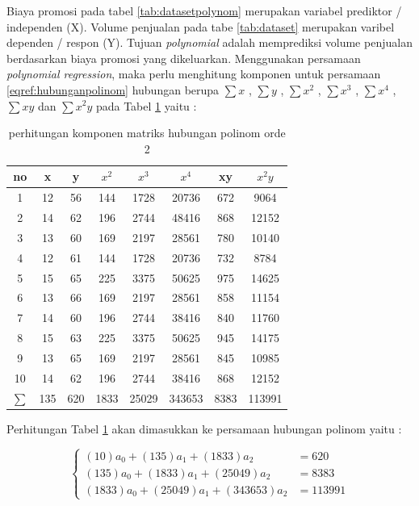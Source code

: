 \documentclass[a4paper,twoside]{article}
\begin{document}
\begin{enumerate}
Biaya promosi pada tabel \ref{tab:datasetpolynom} merupakan variabel prediktor / independen (X). Volume penjualan pada tabe \ref{tab:dataset} merupakan varibel dependen / respon (Y). Tujuan \textit{polynomial} adalah memprediksi volume penjualan berdasarkan biaya promosi yang dikeluarkan. Menggunakan persamaan \textit{polynomial regression}, maka perlu menghitung komponen untuk persamaan \eqref{eqref:hubunganpolinom} hubungan berupa $\sum x$ , $\sum y$ , $\sum x^2$ , $\sum x^3$ , $\sum x^4$ , $\sum xy$ dan $\sum x^2 y$ pada Tabel \ref{tab:tabelhubunganpolinomcontoh}  yaitu :  

\begin{table}[ht]
\centering 
\begin{tabular}{|c|c|c|c|c|c|c|c|}
\hline 
no & x & y & $x^2$ & $x^3$ & $x^4$ & xy & $x^2 y$ \\ 
\hline 
1 & 12 & 56 & 144 & 1728 & 20736 & 672 & 9064 \\ 
\hline 
2 & 14 & 62 & 196 & 2744 & 48416 & 868 & 12152 \\ 
\hline 
3 & 13 & 60 & 169 & 2197 & 28561 & 780 & 10140 \\ 
\hline 
4 & 12 & 61 & 144 & 1728 & 20736 & 732 & 8784 \\ 
\hline 
5 & 15 & 65 & 225 & 3375 & 50625 & 975 & 14625 \\ 
\hline 
6 & 13 & 66 & 169 & 2197 & 28561 & 858 & 11154 \\ 
\hline 
7 & 14 & 60 & 196 & 2744 & 38416 & 840 & 11760 \\ 
\hline 
8 & 15 & 63 & 225 & 3375 & 50625 & 945 & 14175 \\ 
\hline 
9 & 13 & 65 & 169 & 2197 & 28561 & 845 & 10985 \\ 
\hline 
10 & 14 & 62 & 196 & 2744 & 38416 & 868 & 12152 \\ 
\hline 
$\sum  $ & 135 & 620 & 1833 & 25029 & 343653 & 8383 & 113991 \\ 
\hline 
\end{tabular} 
\caption{perhitungan komponen matriks hubungan polinom orde 2}
\label{tab:tabelhubunganpolinomcontoh}
\end{table}

Perhitungan Tabel \ref{tab:tabelhubunganpolinomcontoh} akan dimasukkan ke persamaan hubungan polinom yaitu : 

\begin{displaymath}
		\begin{cases}
		   	(10)a_0 + (135) a_1 + (1833)a_2 &= 620 \\
		   		(135) a_0 + (1833)a_1 + (25049)a_2 &= 8383 \\
		   		(1833)a_0 + (25049)a_1 + (343653)a_2 &= 113991	   
		\end{cases}  
\end{displaymath} 


\end{enumerate}
\end{document}
